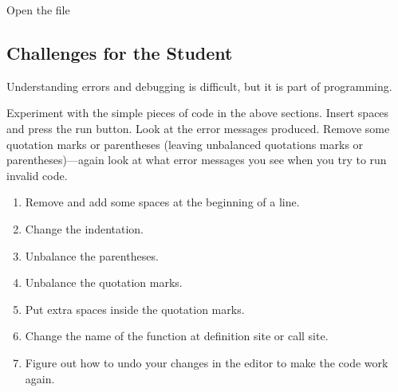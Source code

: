 Open the file 

\subsection{Challenges for the Student}

Understanding errors and debugging is difficult, but it is part of programming.

Experiment with the simple pieces of code in the above sections.
Insert spaces and press the run button.  Look at the error messages
produced. Remove some quotation marks or parentheses (leaving
unbalanced quotations marks or parentheses)---again look at what error
messages you see when you try to run invalid code.


\begin{enumerate}
\item Remove and add some spaces at the beginning of a line.
\item Change the indentation.
\item Unbalance the parentheses.
\item Unbalance the quotation marks.
\item Put extra spaces inside the quotation marks.
\item Change the name of the  function at definition site or call site.
\item Figure out how to undo your changes in the editor to make the code work again.
\end{enumerate}

\clearpage

